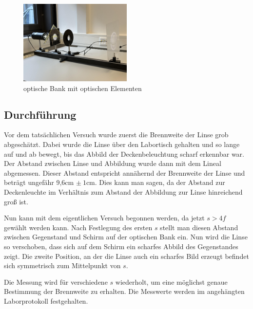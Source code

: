 \documentclass[a4paper,12pt]{article}
\begin{document}
\begin{figure}[H]
    \centering
    \includegraphics[width=0.5\textwidth]{bilder/Versuchsaufbau1.jpg}           %
    \caption{optische Bank mit optischen Elementen}                             %
    \label{Abb:Versuchsaufbau1}
\end{figure}

\subsection{Durchführung}
\label{sec:Durchfuehrung}

Vor dem tatsächlichen Versuch wurde zuerst die Brennweite der Linse grob abgeschätzt.
Dabei wurde die Linse über den Labortisch gehalten und so lange auf und ab bewegt, bis das
Abbild der Deckenbeleuchtung scharf erkennbar war. Der Abstand zwischen Linse und Abbildung
wurde dann mit dem Lineal abgemessen. Dieser Abstand entspricht annähernd der Brennweite
der Linse und beträgt ungefähr 9,6cm $\pm\:1\mathrm{cm}$. Dies kann man sagen, da der Abstand
zur Deckenleuchte im Verhältnis zum Abstand der Abbildung zur Linse hinreichend groß ist.

Nun kann mit dem eigentlichen Versuch begonnen werden, da jetzt $s>4f$ gewählt werden kann.
Nach Festlegung des ersten $s$ stellt man diesen Abstand zwischen Gegenstand und Schirm auf der
optischen Bank ein. Nun wird die Linse so verschoben, dass sich auf dem Schirm ein scharfes
Abbild des Gegenstandes zeigt. Die zweite Position, an der die Linse auch ein scharfes Bild erzeugt
befindet sich symmetrisch zum Mittelpunkt von $s$.

Die Messung wird für verschiedene $s$ wiederholt, um eine möglichst genaue Bestimmung der Brennweite
zu erhalten. Die Messwerte werden im angehängten Laborprotokoll festgehalten.
\end{document}
